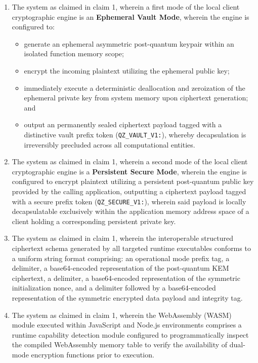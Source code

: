 \documentclass[12pt, a4paper]{article}
\begin{document}
\begin{enumerate}
    \item The system as claimed in claim 1, wherein a first mode of the local client cryptographic engine is an \textbf{Ephemeral Vault Mode}, wherein the engine is configured to:
    \begin{itemize}
        \item generate an ephemeral asymmetric post-quantum keypair within an isolated function memory scope;
        \item encrypt the incoming plaintext utilizing the ephemeral public key;
        \item immediately execute a deterministic deallocation and zeroization of the ephemeral private key from system memory upon ciphertext generation; and
        \item output an permanently sealed ciphertext payload tagged with a distinctive vault prefix token (\texttt{QZ\_VAULT\_V1:}), whereby decapsulation is irreversibly precluded across all computational entities.
    \end{itemize}
    
    \item The system as claimed in claim 1, wherein a second mode of the local client cryptographic engine is a \textbf{Persistent Secure Mode}, wherein the engine is configured to encrypt plaintext utilizing a persistent post-quantum public key provided by the calling application, outputting a ciphertext payload tagged with a secure prefix token (\texttt{QZ\_SECURE\_V1:}), wherein said payload is locally decapsulatable exclusively within the application memory address space of a client holding a corresponding persistent private key.
    
    \item The system as claimed in claim 1, wherein the interoperable structured ciphertext schema generated by all targeted runtime executables conforms to a uniform string format comprising: an operational mode prefix tag, a delimiter, a base64-encoded representation of the post-quantum KEM ciphertext, a delimiter, a base64-encoded representation of the symmetric initialization nonce, and a delimiter followed by a base64-encoded representation of the symmetric encrypted data payload and integrity tag.
    
    \item The system as claimed in claim 1, wherein the WebAssembly (WASM) module executed within JavaScript and Node.js environments comprises a runtime capability detection module configured to programmatically inspect the compiled WebAssembly memory table to verify the availability of dual-mode encryption functions prior to execution.
    

\end{enumerate}
\end{document}
